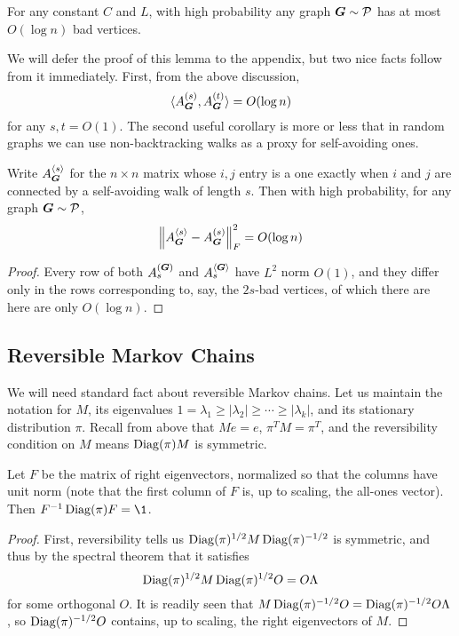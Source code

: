 \begin{lemma}
\begin{lemma} \label{lem:bad-vtx}
    For any constant $C$ and $L$, with high probability any graph $\boldsymbol{G} \sim \mathcal{P}$ has at most $O(\log n)$ bad vertices.
\end{lemma}

We will defer the proof of this lemma to the appendix, but two nice facts follow from it immediately. First, from the above discussion,
$$
    \langle A^{(s)}_{\boldsymbol{G}},A^{(t)}_{\boldsymbol{G}} \rangle = O(\log n)
$$
for any $s,t=O(1)$. The second useful corollary is more or less that in random graphs we can use non-backtracking walks as a proxy for self-avoiding ones.

\begin{lemma} \label{lem:sa-nb}
    Write $A^{\langle s \rangle}_{\boldsymbol{G}}$ for the $n\times n$ matrix whose $i,j$ entry is a one exactly when $i$ and $j$ are connected by a self-avoiding walk of length $s$. Then with high probability, for any graph $\boldsymbol{G} \sim \mathcal{P}$,
    \begin{equation}
        \left\| A^{\langle s \rangle}_{\boldsymbol{G}} - A^{(s)}_{\boldsymbol{G}} \right\|_F^2 = O(\log n)
    \end{equation}
\end{lemma}

\begin{proof}
    Every row of both $A^{(\boldsymbol{G})}_{s}$ and $A^{\langle \boldsymbol{G} \rangle}_{s}$ have $L^2$ norm $O(1)$, and they differ only in the rows corresponding to, say, the $2s$-bad vertices, of which there are here are only $O(\log n)$.
\end{proof}

\subsection{Reversible Markov Chains}

We will need standard fact about reversible Markov chains. Let us maintain the notation for $M$, its eigenvalues $1 = \lambda_1 \ge |\lambda_2| \ge \cdots \ge |\lambda_k|$, and its stationary distribution $\pi$. Recall from above that $Me = e$, $\pi^T M = \pi^T$, and the reversibility condition on $M$ means $\operatorname{Diag}(\pi)M$ is symmetric. 

\begin{lemma} \label{lem:markov-ev}
    Let $F$ be the matrix of right eigenvectors, normalized so that the columns have unit norm (note that the first column of $F$ is, up to scaling, the all-ones vector). Then $F^{-1}\Diag(\pi) F = \1$.
\end{lemma}

\begin{proof}
    First, reversibility tells us $\operatorname{Diag}(\pi)^{1/2}M\operatorname{Diag}(\pi)^{-1/2}$ is symmetric, and thus by the spectral theorem that it satisfies 
    $$
        \operatorname{Diag}(\pi)^{1/2}M\operatorname{Diag}(\pi)^{1/2}O = O\Lambda
    $$ 
    for some orthogonal $O$. It is readily seen that $M\operatorname{Diag}(\pi)^{-1/2}O = \operatorname{Diag}(\pi)^{-1/2}O\Lambda$, so $\operatorname{Diag}(\pi)^{-1/2}O$ contains, up to scaling, the right eigenvectors of $M$.
\end{proof}


\end{lemma}
